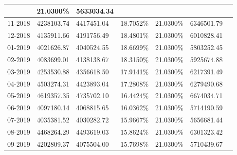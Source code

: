 \documentclass{report}
\begin{document}
\begin{longtable}[c]{|p{1.7cm}|p{2.6cm}|p{2.6cm}|p{2.3cm}|p{2.3cm}|p{2.3cm}|c|}
& 21.0300\% & 5633034.34\\ \hline11-2018 & 4238103.74 & 4417451.04 & 18.7052\% & 21.0300\% & 6346501.79\\ \hline12-2018 & 4135911.66 & 4191756.49 & 18.4801\% & 21.0300\% & 6010828.41\\ \hline01-2019 & 4021626.87 & 4040524.55 & 18.6699\% & 21.0300\% & 5803252.45\\ \hline02-2019 & 4083699.01 & 4138138.67 & 18.3150\% & 21.0300\% & 5925674.88\\ \hline03-2019 & 4253530.88 & 4356618.50 & 17.9141\% & 21.0300\% & 6217391.49\\ \hline04-2019 & 4503274.31 & 4423893.04 & 17.2808\% & 21.0300\% & 6279490.68\\ \hline05-2019 & 4619357.35 & 4735702.10 & 16.4424\% & 21.0300\% & 6674034.71\\ \hline06-2019 & 4097180.14 & 4068815.65 & 16.0362\% & 21.0300\% & 5714190.59\\ \hline07-2019 & 4035381.52 & 4030282.72 & 15.9667\% & 21.0300\% & 5656681.44\\ \hline08-2019 & 4468264.29 & 4493619.03 & 15.8624\% & 21.0300\% & 6301323.42\\ \hline09-2019 & 4202809.37 & 4075504.00 & 15.7698\% & 21.0300\% & 5710439.67\\ \hline
\end{longtable}
\end{document}
